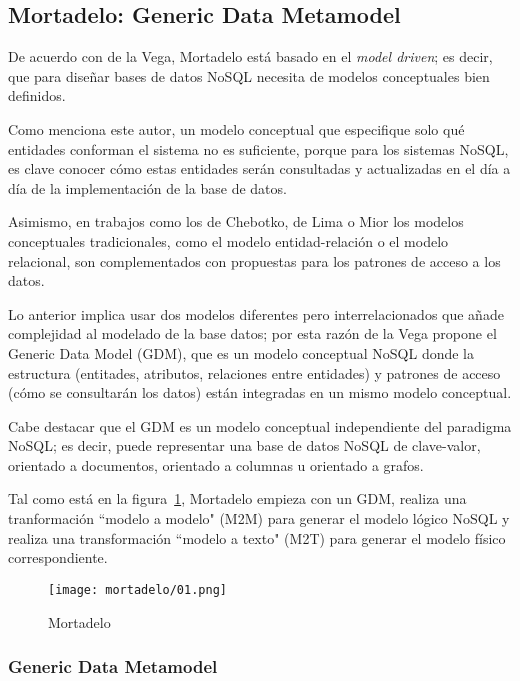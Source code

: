 \subsection{Mortadelo: Generic Data Metamodel}
De acuerdo con de la Vega\cite{de_la_vega_mortadelo_2020}, Mortadelo está basado en el \textit{model driven}; es decir, que para diseñar bases de datos NoSQL necesita de modelos conceptuales bien definidos.


Como menciona este autor, un modelo conceptual que especifique solo qué entidades conforman el sistema no es suficiente, porque para los sistemas NoSQL, es clave conocer cómo estas entidades serán consultadas y actualizadas en el día a día de la implementación de la base de datos.


Asimismo, en trabajos como los de Chebotko\cite{chebotko_big_2015}, de Lima\cite{de_lima_workload-driven_2015} o Mior\cite{mior_nose_2017-1} los modelos conceptuales tradicionales, como el modelo entidad-relación o el modelo relacional, son complementados con propuestas para los patrones de acceso a los datos.


Lo anterior implica usar dos modelos diferentes pero interrelacionados que añade complejidad al modelado de la base datos; por esta razón de la Vega propone el Generic Data Model (GDM), que es un modelo conceptual NoSQL donde la estructura (entitades, atributos, relaciones entre entidades) y patrones de acceso (cómo se consultarán los datos) están integradas en un mismo modelo conceptual.


Cabe destacar que el GDM es un modelo conceptual independiente del paradigma NoSQL; es decir, puede representar una base de datos NoSQL de clave-valor, orientado a documentos, orientado a columnas u orientado a grafos.


Tal como está en la figura~\ref{img:mortadelo-process}, Mortadelo empieza con un GDM, realiza una tranformación ``modelo a modelo" (M2M) para generar el modelo lógico NoSQL y realiza una transformación ``modelo a texto" (M2T) para generar el modelo físico correspondiente.


\begin{figure}[h!t] 
    \centering
    \texttt{[image: mortadelo/01.png]}
    \caption{Mortadelo}
    \label{img:mortadelo-process}
\end{figure}

\subsubsection*{Generic Data Metamodel}

